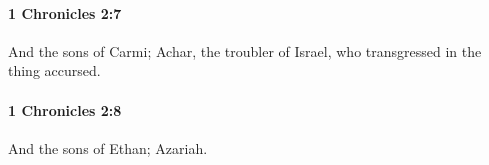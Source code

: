 		\paragraph{1 Chronicles 2:7} %
			\label{1CHRONICLES-2-7}

			And the sons of Carmi; Achar, the troubler of Israel, who transgressed in the thing accursed.


		\paragraph{1 Chronicles 2:8} %
			\label{1CHRONICLES-2-8}

			And the sons of Ethan; Azariah.


